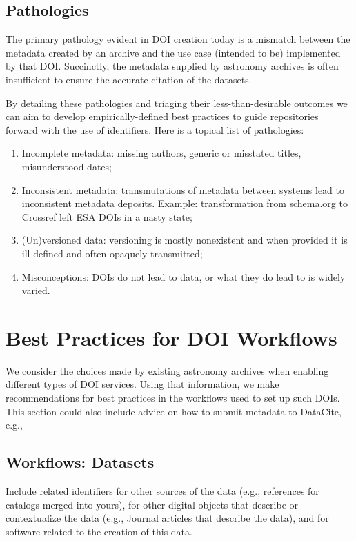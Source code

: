 \documentclass[11pt,a4paper]{ivoa}
\begin{document}
\subsection{Pathologies}
\label{sec:use:patho}

The primary pathology evident in DOI creation today is a mismatch between the metadata created by an archive and the use case (intended to be) implemented by that DOI. 
Succinctly, the metadata supplied by astronomy archives is often insufficient to ensure the accurate citation of the datasets.

By detailing these pathologies and triaging their less-than-desirable outcomes we can aim to develop empirically-defined best practices to guide repositories forward with the use of identifiers.
Here is a topical list of pathologies:

\begin{enumerate}
\item Incomplete metadata: missing authors, generic or misstated titles, misunderstood dates;
\item Inconsistent metadata: transmutations of metadata between systems lead to inconsistent metadata deposits. Example: transformation from schema.org to Crossref left ESA DOIs in a nasty state;
\item (Un)versioned data: versioning is mostly nonexistent and when provided it is ill defined and often opaquely transmitted;
\item Misconceptions: DOIs do not lead to data, or what they do lead to is widely varied.
\end{enumerate}


\section{Best Practices for DOI Workflows}
\label{sec:bpwork}
We consider the choices made by existing astronomy archives when enabling different types of DOI services.
Using that information, we make recommendations for best practices in the workflows used to set up such DOIs. 
This section could also include advice on how to submit metadata to DataCite, e.g., 

\subsection{Workflows: Datasets}
Include related identifiers for other sources of the data (e.g., references for catalogs merged into yours), for other digital objects that describe or contextualize the data (e.g., Journal articles that describe the data), and for software related to the creation of this data. 
\end{document}
